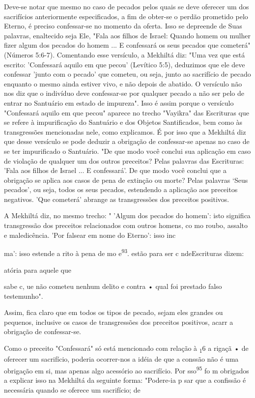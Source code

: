 \begin{itemize}
\begin{enumrate}
\begin{itemize}
\begin{itemize}
Deve-se notar que mesmo no caso de pecados pelos quais se deve oferecer
um dos sacrifícios anteriormente especificados, a fim de obter-se o
per­dão prometido pelo Eterno, é preciso confessar-se no momento da
oferta. Isso se depreende de Suas palavras, enaltecido seja Ele, "Fala
aos filhos de Israel: Quando homem ou mulher fizer algum dos pecados do
homem ... E confes­sará os seus pecados que cometerá" (Números 5:6-7).
Comentando esse versí­culo, a Mekhiltá diz: "Uma vez que está escrito:
'Confessará aquilo em que pe­cou' (Levítico 5:5), deduzimos que ele deve
confessar 'junto com o pecado' que cometeu, ou seja, junto ao sacrifício
de pecado enquanto o mesmo ainda estiver vivo, e não depois de abatido.
O versículo não nos diz que o indivíduo deve confessar-se por qualquer
pecado a não ser pelo de entrar no Santuário em estado de impureza".
Isso é assim porque o versículo "Confessará aquilo em que pecou" aparece
no trecho "Vayikra" das Escrituras que se refere à im­purificação do
Santuário e dos Objetos Santificados, bem como às transgres­sões
mencionadas nele, como explicamos. É por isso que a Mekhiltá diz que
desse versículo se pode deduzir a obrigação de confessar-se apenas no
caso de se ter impurificado o Santuário. "De que modo você conclui sua
aplicação em caso de violação de qualquer um dos outros preceitos? Pelas
palavras das Escri­turas: 'Fala aos filhos de Israel ... E confessará'.
De que modo você conclui que a obrigação se aplica aos casos de pena de
extinção ou morte? Pelas palavras `Seus pecados', ou seja, todos os seus
pecados, estendendo a aplicação aos preceitos negativos. 'Que cometerá'
abrange as transgressões dos preceitos positivos.

A Mekhiltá diz, no mesmo trecho: " 'Algum dos pecados do homem': isto
significa transgressão dos preceitos relacionados com outros homens, co
mo roubo, assalto e maledicência. 'Por falsear em nome do Eterno': isso
inc


ma': isso estende a ri­to à pena de mo e\textsuperscript{93}. estão para
ser c nde­Escrituras dizem:

atória para aquele que

sabe c, ue não cometeu nenhum delito e contra • qual foi prestado falso
testemunho".

Assim, fica claro que em todos os tipos de pecado, sejam eles gran­des
ou pequenos, inclusive os casos de transgressões dos preceitos
positivos, acarr a obrigação de confessar-se.

Como o preceito "Confessará" só está mencionado com relação à
\textsubscript{1}6 a rigaçã • de oferecer um sacrifício, poderia
ocorrer-nos a idéia de que a con­ssão não é uma obrigação em si, mas
apenas algo acessório ao sacrifício. Por sso\textsuperscript{95} fo m
obrigados a explicar isso na Mekhiltá da seguinte forma: "Poder­e-ia p
sar que a confissão é necessária quando se oferece um sacrifício; de



\end{itemize}
\end{itemize}
\end{enumrate}
\end{itemize}
